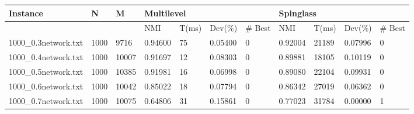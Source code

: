 \begin{sidewaystable} %
	\label{table:results3}
	\begin{tabular}{lllllllllll}
		\hline
		\multicolumn{1}{|l|}{Instance}             & \multicolumn{1}{l|}{N}    & \multicolumn{1}{l|}{M}     & \multicolumn{4}{l|}{Multilevel}                                                                                         & \multicolumn{4}{l|}{Spinglass}                                                                                          \\ \hline
		\multicolumn{1}{|l|}{}                     & \multicolumn{1}{l|}{}     & \multicolumn{1}{l|}{}      & \multicolumn{1}{l|}{NMI}     & \multicolumn{1}{l|}{T(ms)} & \multicolumn{1}{l|}{Dev(\%)} & \multicolumn{1}{l|}{\# Best} & \multicolumn{1}{l|}{NMI}     & \multicolumn{1}{l|}{T(ms)} & \multicolumn{1}{l|}{Dev(\%)} & \multicolumn{1}{l|}{\# Best} \\ \hline
		\multicolumn{1}{|l|}{1000\_0.3network.txt} & \multicolumn{1}{l|}{1000} & \multicolumn{1}{l|}{9716}  & \multicolumn{1}{l|}{0.94600} & \multicolumn{1}{l|}{75}    & \multicolumn{1}{l|}{0.05400} & \multicolumn{1}{l|}{0}       & \multicolumn{1}{l|}{0.92004} & \multicolumn{1}{l|}{21189} & \multicolumn{1}{l|}{0.07996} & \multicolumn{1}{l|}{0}       \\ \hline
		\multicolumn{1}{|l|}{1000\_0.4network.txt} & \multicolumn{1}{l|}{1000} & \multicolumn{1}{l|}{10007} & \multicolumn{1}{l|}{0.91697} & \multicolumn{1}{l|}{12}    & \multicolumn{1}{l|}{0.08303} & \multicolumn{1}{l|}{0}       & \multicolumn{1}{l|}{0.89881} & \multicolumn{1}{l|}{18105} & \multicolumn{1}{l|}{0.10119} & \multicolumn{1}{l|}{0}       \\ \hline
		\multicolumn{1}{|l|}{1000\_0.5network.txt} & \multicolumn{1}{l|}{1000} & \multicolumn{1}{l|}{10385} & \multicolumn{1}{l|}{0.91981} & \multicolumn{1}{l|}{16}    & \multicolumn{1}{l|}{0.06998} & \multicolumn{1}{l|}{0}       & \multicolumn{1}{l|}{0.89080} & \multicolumn{1}{l|}{22104} & \multicolumn{1}{l|}{0.09931} & \multicolumn{1}{l|}{0}       \\ \hline
		\multicolumn{1}{|l|}{1000\_0.6network.txt} & \multicolumn{1}{l|}{1000} & \multicolumn{1}{l|}{10042} & \multicolumn{1}{l|}{0.85022} & \multicolumn{1}{l|}{18}    & \multicolumn{1}{l|}{0.07794} & \multicolumn{1}{l|}{0}       & \multicolumn{1}{l|}{0.86342} & \multicolumn{1}{l|}{27019} & \multicolumn{1}{l|}{0.06362} & \multicolumn{1}{l|}{0}       \\ \hline
		\multicolumn{1}{|l|}{1000\_0.7network.txt} & \multicolumn{1}{l|}{1000} & \multicolumn{1}{l|}{10075} & \multicolumn{1}{l|}{0.64806} & \multicolumn{1}{l|}{31}    & \multicolumn{1}{l|}{0.15861} & \multicolumn{1}{l|}{0}       & \multicolumn{1}{l|}{0.77023} & \multicolumn{1}{l|}{31784} & \multicolumn{1}{l|}{0.00000} & \multicolumn{1}{l|}{1}       \\ \hline

\end{tabular}
\end{sidewaystable}
